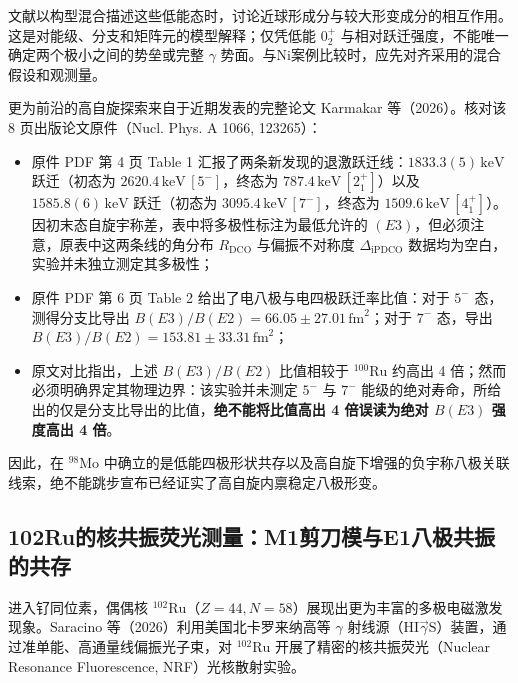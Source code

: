 文献以构型混合描述这些低能态时，讨论近球形成分与较大形变成分的相互作用。这是对能级、分支和矩阵元的模型解释；仅凭低能 $0_2^+$ 与相对跃迁强度，不能唯一确定两个极小之间的势垒或完整 $\gamma$ 势面。与Ni案例比较时，应先对齐采用的混合假设和观测量。

更为前沿的高自旋探索来自于近期发表的完整论文 Karmakar 等（2026）\cite{karmakar-2026-98mo-octupole}。核对该 8 页出版论文原件（Nucl. Phys. A 1066, 123265）：
\begin{itemize}
\item 原件 PDF 第 4 页 Table 1 汇报了两条新发现的退激跃迁线：\allowbreak{}$1833.3(5)\,\mathrm{keV}$ 跃迁（初态为 $2620.4\,\mathrm{keV}\,[5^-]$，终态为 $787.4\,\mathrm{keV}\,[2^+_1]$）\allowbreak{}以及 $1585.8(6)\,\mathrm{keV}$ 跃迁（初态为 $3095.4\,\mathrm{keV}\,[7^-]$，终态为 $1509.6\,\mathrm{keV}\,[4^+_1]$）。因初末态自旋宇称差，表中将多极性标注为最低允许的 $(E3)$，但必须注意，原表中这两条线的角分布\allowbreak{} $R_{\mathrm{DCO}}$ 与偏振不对称度 $\Delta_{\mathrm{iPDCO}}$ 数据均为空白，实验并未独立测定其多极性；
\item 原件 PDF 第 6 页 Table 2 给出了电八极与电四极跃迁率比值：对于 $5^-$ 态，测得分支比导出 $B(E3)/B(E2) = 66.05 \pm 27.01\,\mathrm{fm}^2$；对于 $7^-$ 态，导出 $B(E3)/B(E2) = 153.81 \pm 33.31\,\mathrm{fm}^2$；
\item 原文对比指出，上述 $B(E3)/B(E2)$ 比值相较于 $^{100}\mathrm{Ru}$ 约高出 4 倍；然而必须明确界定其物理边界：该实验并未测定 $5^-$ 与 $7^-$ 能级的绝对寿命，所给出的仅是分支比导出的比值，\textbf{绝不能将比值高出 4 倍误读为绝对 $B(E3)$ 强度高出 4 倍}。
\end{itemize}
因此，在 $^{98}\mathrm{Mo}$ 中确立的是低能四极形状共存以及高自旋下增强的负宇称八极关联线索，绝不能跳步宣布已经证实了高自旋内禀稳定八极形变。

\subsection{102Ru的核共振荧光测量：M1剪刀模与E1八极共振的共存}\label{sec:4-3-4}

进入钌同位素，偶偶核 $^{102}\mathrm{Ru}$（$Z=44, N=58$）展现出更为丰富的多极电磁激发现象。Saracino 等（2026）\cite{saracino-2026-102ru-scissors-octupole-resonances}利用美国北卡罗来纳高等 $\gamma$ 射线源（$\mathrm{HI}\vec{\gamma}\mathrm{S}$）装置，通过准单能、高通量线偏振光子束，对 $^{102}\mathrm{Ru}$ 开展了精密的核共振荧光（Nuclear Resonance Fluorescence, NRF）光核散射实验。

